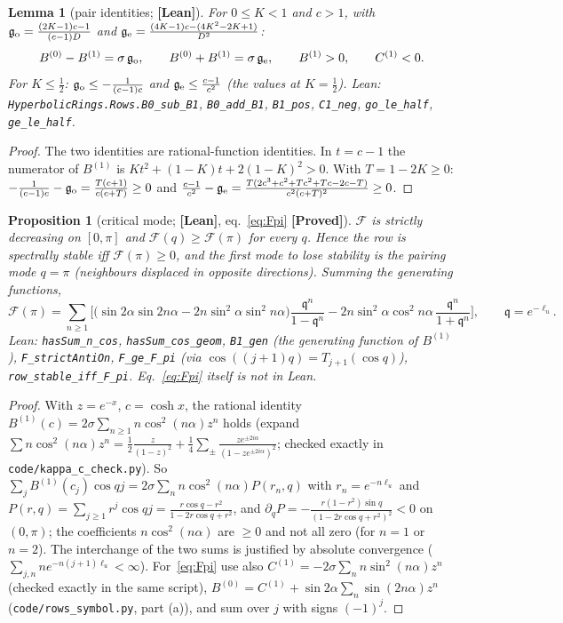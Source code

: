 \documentclass[11pt]{article}
\newtheorem{lemma}[theorem]{Lemma}
\newtheorem{proposition}[theorem]{Proposition}
\theoremstyle{definition}
\theoremstyle{remark}
\newcommand{\st}[1]{\textbf{[#1]}}
\newcommand{\lean}[1]{\nolinkurl{#1}}
\begin{document}
\begin{lemma}[pair identities; \st{Lean}]\label{lem:pair}
For $0\le K<1$ and $c>1$, with $\mathfrak g_{\rm o}=\frac{(2K-1)c-1}{(c-1)D}$ and $\mathfrak g_{\rm e}=\frac{(4K-1)c-(4K^2-2K+1)}{D^2}$:
\[
B^{(0)}-B^{(1)}=\sigma\,\mathfrak g_{\rm o},\qquad B^{(0)}+B^{(1)}=\sigma\,\mathfrak g_{\rm e},\qquad B^{(1)}>0,\qquad C^{(1)}<0 .
\]
For $K\le\frac12$: $\mathfrak g_{\rm o}\le-\frac1{(c-1)c}$ and $\mathfrak g_{\rm e}\le\frac{c-1}{c^2}$ (the values at $K=\frac12$).
Lean: \lean{HyperbolicRings.Rows.B0_sub_B1}, \lean{B0_add_B1}, \lean{B1_pos}, \lean{C1_neg}, \lean{go_le_half}, \lean{ge_le_half}.
\end{lemma}
\begin{proof}
The two identities are rational-function identities. In $t=c-1$ the numerator of $B^{(1)}$ is $Kt^2+(1-K)t+2(1-K)^2>0$. With
$T=1-2K\ge0$: $-\frac1{(c-1)c}-\mathfrak g_{\rm o}=\frac{T(c+1)}{c(c+T)}\ge0$ and
$\frac{c-1}{c^2}-\mathfrak g_{\rm e}=\frac{T(2c^3+c^2+Tc^2+Tc-2c-T)}{c^2(c+T)^2}\ge0$.
\end{proof}

\begin{proposition}[critical mode; \st{Lean}, eq.~\eqref{eq:Fpi} \st{Proved}]\label{prop:critq}
$\mathcal F$ is strictly decreasing on $[0,\pi]$ and $\mathcal F(q)\ge\mathcal F(\pi)$ for every $q$. Hence the row is spectrally stable iff $\mathcal F(\pi)\ge0$, and the first mode
to lose stability is the pairing mode $q=\pi$ (neighbours displaced in opposite directions). Summing the generating functions,
\begin{equation}\label{eq:Fpi}
\mathcal F(\pi)=\sum_{n\ge1}\Big[\big(\sin2\alpha\sin2n\alpha-2n\sin^2\alpha\sin^2n\alpha\big)\frac{\mathfrak q^n}{1-\mathfrak q^n}
-2n\sin^2\alpha\cos^2n\alpha\,\frac{\mathfrak q^n}{1+\mathfrak q^n}\Big],\qquad \mathfrak q=e^{-\ell_u}.
\end{equation}
Lean: \lean{hasSum_n_cos}, \lean{hasSum_cos_geom}, \lean{B1_gen} (the generating function of $B^{(1)}$), \lean{F_strictAntiOn},
\lean{F_ge_F_pi} (via $\cos((j{+}1)q)=T_{j+1}(\cos q)$), \lean{row_stable_iff_F_pi}. Eq.~\eqref{eq:Fpi} itself is not in Lean.
\end{proposition}
\begin{proof}
With $z=e^{-x}$, $c=\cosh x$, the rational identity $B^{(1)}(c)=2\sigma\sum_{n\ge1}n\cos^2(n\alpha)z^n$ holds (expand
$\sum n\cos^2(n\alpha)z^n=\frac12\frac z{(1-z)^2}+\frac14\sum_\pm\frac{ze^{\pm2i\alpha}}{(1-ze^{\pm2i\alpha})^2}$; checked exactly in
\nolinkurl{code/kappa_c_check.py}). So $\sum_jB^{(1)}(c_j)\cos qj=2\sigma\sum_nn\cos^2(n\alpha)P(r_n,q)$ with $r_n=e^{-n\ell_u}$ and
$P(r,q)=\sum_{j\ge1}r^j\cos qj=\frac{r\cos q-r^2}{1-2r\cos q+r^2}$, and $\partial_qP=-\frac{r(1-r^2)\sin q}{(1-2r\cos q+r^2)^2}<0$ on
$(0,\pi)$; the coefficients $n\cos^2(n\alpha)$ are $\ge0$ and not all zero (for $n=1$ or $n=2$). The interchange of the
two sums is justified by absolute convergence ($\sum_{j,n}ne^{-n(j+1)\ell_u}<\infty$). For~\eqref{eq:Fpi} use also
$C^{(1)}=-2\sigma\sum_nn\sin^2(n\alpha)z^n$ (checked exactly in the same script), $B^{(0)}=C^{(1)}+\sin2\alpha\sum_n\sin(2n\alpha)z^n$
(\nolinkurl{code/rows_symbol.py}, part (a)), and sum over $j$ with signs $(-1)^j$.
\end{proof}
\end{document}
